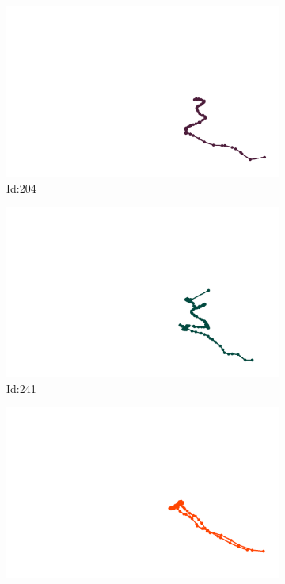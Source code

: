 \documentclass[12pt,twoside]{report}
\begin{document}
\begin{figure}
\centering
\begin{subfigure}[b]{0.20\textwidth}
\centering
\includegraphics[width=\textwidth]{../../trajectories/204.png}
\caption{Id:204}
\end{subfigure}
\begin{subfigure}[b]{0.20\textwidth}
\centering
\includegraphics[width=\textwidth]{../../trajectories/241.png}
\caption{Id:241}
\end{subfigure}
\begin{subfigure}[b]{0.20\textwidth}
\centering
\includegraphics[width=\textwidth]{../../trajectories/391.png}

\end{subfigure}
\end{figure}
\end{document}
